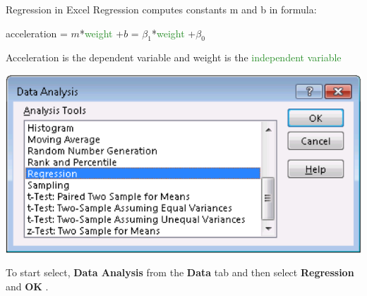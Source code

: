 \documentclass[xcolor=svgnames]{beamer}
\newcommand{\yellow}[1]{\textcolor{iyellow}{#1}}
\begin{document}
\begin{frame}[label=current]{Regression in Excel}
Regression computes constants m and b in formula:
\begin{center}
\yellow{acceleration} = $m$*\textcolor{ForestGreen}{weight} +$b$ = $\beta_1$*\textcolor{ForestGreen}{weight} +$\beta_0$
\end{center}
Acceleration is the \yellow{dependent variable} and weight is the \textcolor{ForestGreen}{independent variable}\\[1em]
\begin{center}
\includegraphics[height=.45\textheight]{Regression2}
\end{center}
To start select, {\bf Data Analysis} from the {\bf Data} tab  and then select {\bf Regression} and {\bf OK} . 
\end{frame}
\end{document}
